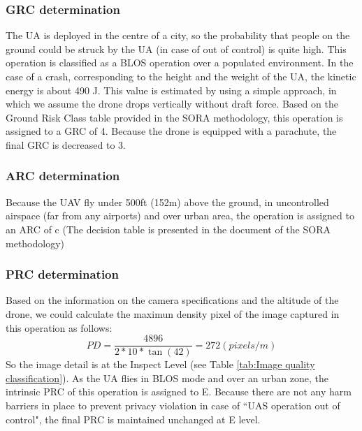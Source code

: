 \documentclass[a4paper, 10, conference]{ieeeconf}  %
\begin{document}
\subsubsection{GRC determination}

The UA is deployed in the centre of a city, so the probability that people on the ground could be struck by the UA (in case of out of control) is quite high. This operation is classified as a BLOS operation over a populated environment. In the case of a crash, corresponding to the height and the weight of the UA, the kinetic energy is about 490 J. This value is estimated by using a simple approach, in which we assume the drone drops vertically without draft force. Based on the Ground Risk Class table provided in the SORA methodology, this operation is assigned to a GRC of 4. Because the drone is equipped with a parachute, the final GRC is decreased to 3.

\subsubsection{ARC determination}

Because the UAV fly under 500ft (152m) above the ground, in uncontrolled airspace (far from any airports) and over urban area, the operation is assigned to an ARC of c (The decision table is presented in the document of  the SORA methodology\cite{SORAV2})

\subsubsection{PRC determination}
Based on the information on the camera specifications and the altitude of the drone, we could calculate the maximun density pixel of the image captured in this operation as follows:
 \[PD=\frac{4896}{2*10*\tan(42)} = 272 (pixels/m)\]
So the image detail is  at the Inspect Level (see Table \ref{tab:Image quality classification}). As the UA flies in BLOS mode and over an urban zone, the intrinsic PRC of this operation is assigned to E. Because there are not any harm barriers in place to prevent privacy violation in case of ``UAS operation out of control", the final PRC is maintained unchanged at E level.
\end{document}
